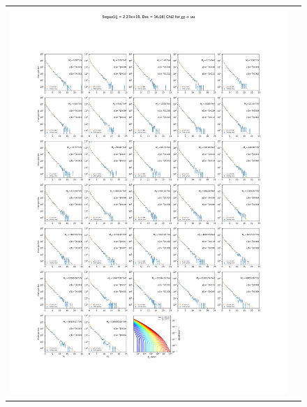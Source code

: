 \begin{figure}[ht]
{\begin{tabular}{cc}
            \includegraphics[clip, trim=22.1cm 6.5cm 19.5cm 56.5cm, scale=0.6]{figures/ic_DM/dm_plots/Segue1_uu_chi2_Masspanel_2024-03-23.pdf} &

\end{tabular}}
\end{figure}
